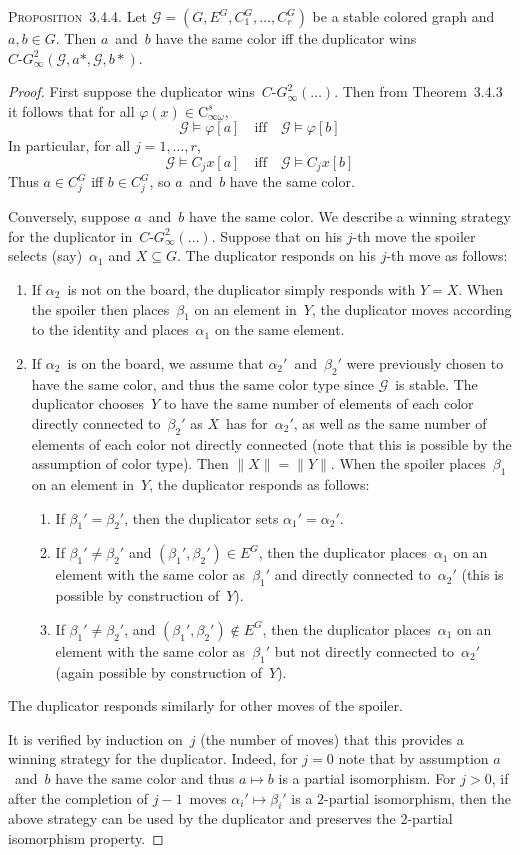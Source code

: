 \documentclass[letterpaper]{article}
\newcommand{\G}{\mathcal{G}}
\newcommand{\cg}{C\text{-}G}
\newcommand{\C}{\mathrm{C}}
\newcommand{\Cio}{\C_{\infty\omega}}
\newcommand{\card}[1]{\|{#1}\|}
\newcommand{\proposition}[1]{\noindent\textsc{Proposition~{#1}.}}
\theoremstyle{plain}
\begin{document}
\proposition{3.4.4}
Let $\G=(G,E^G,C_1^G,\ldots,C_r^G)$ be a stable colored graph and $a,b\in G$. Then $a$~and~$b$ have the same color iff the duplicator wins $\cg_{\infty}^2(\G,a*,\G,b*)$.
\begin{proof}
First suppose the duplicator wins~$\cg_{\infty}^2(\ldots)$. Then from Theorem~3.4.3 it follows that for all $\varphi(x)\in\Cio^s$,
$$\G\models\varphi[a]\quad\text{iff}\quad\G\models\varphi[b]$$
In particular, for all $j=1,\ldots,r$,
$$\G\models C_jx[a]\quad\text{iff}\quad\G\models C_jx[b]$$
Thus $a\in C_j^G$ iff $b\in C_j^G$, so $a$~and~$b$ have the same color.

Conversely, suppose $a$~and~$b$ have the same color. We describe a winning strategy for the duplicator in~$\cg_{\infty}^2(\ldots)$. Suppose that on his $j$-th move the spoiler selects (say)~$\alpha_1$ and $X\subseteq G$. The duplicator responds on his $j$-th move as follows:
\begin{enumerate}
\item If $\alpha_2$~is not on the board, the duplicator simply responds with $Y=X$. When the spoiler then places~$\beta_1$ on an element in~$Y$, the duplicator moves according to the identity and places~$\alpha_1$ on the same element.
\item If $\alpha_2$~is on the board, we assume that $\alpha_2'$~and~$\beta_2'$ were previously chosen to have the same color, and thus the same color type since $\G$~is stable. The duplicator chooses~$Y$ to have the same number of elements of each color directly connected to~$\beta_2'$ as $X$~has for~$\alpha_2'$, as well as the same number of elements of each color not directly connected (note that this is possible by the assumption of color type). Then $\card{X}=\card{Y}$. When the spoiler places~$\beta_1$ on an element in~$Y$, the duplicator responds as follows:
\begin{enumerate}
\item If $\beta_1'=\beta_2'$, then the duplicator sets $\alpha_1'=\alpha_2'$.
\item If $\beta_1'\ne\beta_2'$ and $(\beta_1',\beta_2')\in E^G$, then the duplicator places~$\alpha_1$ on an element with the same color as~$\beta_1'$ and directly connected to~$\alpha_2'$ (this is possible by construction of~$Y$).
\item If $\beta_1'\ne\beta_2'$, and $(\beta_1',\beta_2')\not\in E^G$, then the duplicator places~$\alpha_1$ on an element with the same color as~$\beta_1'$ but not directly connected to~$\alpha_2'$ (again possible by construction of~$Y$).
\end{enumerate}
\end{enumerate}
The duplicator responds similarly for other moves of the spoiler.

It is verified by induction on~$j$ (the number of moves) that this provides a winning strategy for the duplicator. Indeed, for $j=0$ note that by assumption $a$~and~$b$ have the same color and thus $a\mapsto b$ is a partial isomorphism. For $j>0$, if after the completion of $j-1$~moves $\alpha_i'\mapsto\beta_i'$ is a $2$-partial isomorphism, then the above strategy can be used by the duplicator and preserves the $2$-partial isomorphism property.
\end{proof}
\end{document}
